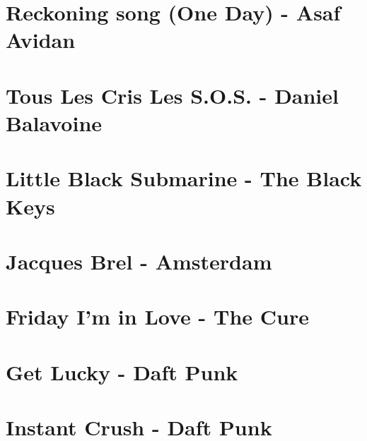 \documentclass{guitartabs}
\begin{document}
\linespread{0.3}
\tableofcontents
\newpage

\linespread{1}


\section{Reckoning song (One Day) - Asaf Avidan}
\begin{guitar}

\end{guitar}


\section{Tous Les Cris Les S.O.S. - Daniel Balavoine}
\begin{guitar}

\end{guitar}


\section{Little Black Submarine - The Black Keys}
\begin{guitar}

\end{guitar}

\section{Jacques Brel - Amsterdam}
\begin{guitar}

\end{guitar}


\section{Friday I'm in Love - The Cure}
\begin{guitar}

\end{guitar}


\section{Get Lucky - Daft Punk}
\begin{guitar}

\end{guitar}


\section{Instant Crush - Daft Punk}
\begin{guitar}

\end{guitar}
\end{document}

